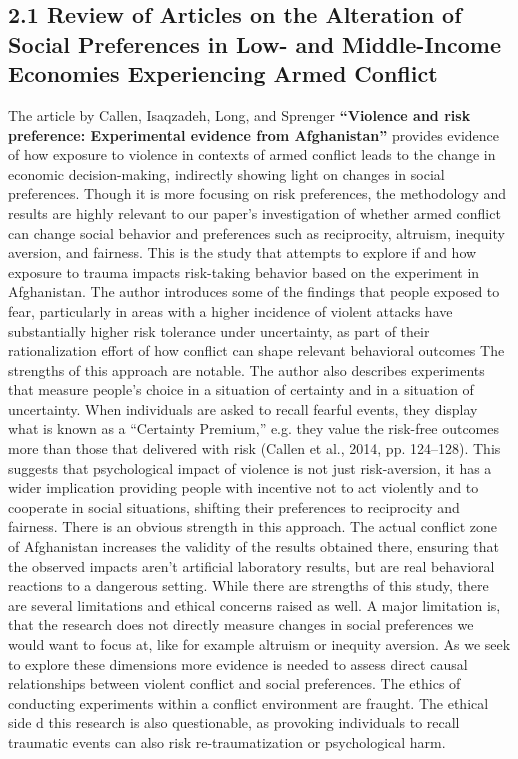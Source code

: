 \documentclass[14pt]{article}
\theoremstyle{remark}
\begin{document}
\subsection{2.1 Review of Articles on the Alteration of Social Preferences in Low- and Middle-Income Economies Experiencing Armed Conflict}

The article by Callen, Isaqzadeh, Long, and Sprenger \textbf{``Violence and risk preference: Experimental evidence from Afghanistan''} provides evidence of how exposure to violence in contexts of armed conflict leads to the change in economic decision-making, indirectly showing light on changes in social preferences. Though it is more focusing on risk preferences, the methodology and results are highly relevant to our paper's investigation of whether armed conflict can change social behavior and preferences such as reciprocity, altruism, inequity aversion, and fairness. This is the study that attempts to explore if and how exposure to trauma impacts risk-taking behavior based on the experiment in Afghanistan. The author introduces some of the findings that people exposed to fear, particularly in areas with a higher incidence of violent attacks have substantially higher risk tolerance under uncertainty, as part of their rationalization effort of how conflict can shape relevant behavioral outcomes The strengths of this approach are notable. The author also describes experiments that measure people's choice in a situation of certainty and in a situation of uncertainty. When individuals are asked to recall fearful events, they display what is known as a ``Certainty Premium,'' e.g. they value the risk-free outcomes more than those that delivered with risk (Callen et al., 2014, pp. 124--128). This suggests that psychological impact of violence is not just risk-aversion, it has a wider implication providing people with incentive not to act violently and to cooperate in social situations, shifting their preferences to reciprocity and fairness. There is an obvious strength in this approach. The actual conflict zone of Afghanistan increases the validity of the results obtained there, ensuring that the observed impacts aren't artificial laboratory results, but are real behavioral reactions to a dangerous setting. While there are strengths of this study, there are several limitations and ethical concerns raised as well. A major limitation is, that the research does not directly measure changes in social preferences we would want to focus at, like for example altruism or inequity aversion. As we seek to explore these dimensions more evidence is needed to assess direct causal relationships between violent conflict and social preferences. The ethics of conducting experiments within a conflict environment are fraught. The ethical side d this research is also questionable, as provoking individuals to recall traumatic events can also risk re-traumatization or psychological harm.
\end{document}
